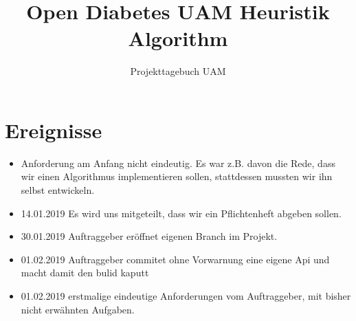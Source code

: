 \documentclass[accentcolor=tud0b,12pt,paper=a4]{tudreport}
\title{Open Diabetes UAM Heuristik Algorithm}
\subtitle{Projekttagebuch UAM}
\begin{document}
	\maketitle
		
	\newpage
	\chapter*{Ereignisse}
	
	
	\begin{itemize}
	
	\item Anforderung am Anfang nicht eindeutig. Es war z.B. davon die Rede, dass wir einen Algorithmus implementieren sollen, stattdessen mussten wir ihn selbst entwickeln.
	\item 14.01.2019 Es wird uns mitgeteilt, dass wir ein Pflichtenheft abgeben sollen.
	\item 30.01.2019 Auftraggeber eröffnet eigenen Branch im Projekt.
	\item 01.02.2019 Auftraggeber commitet ohne Vorwarnung eine eigene Api und macht damit den bulid kaputt 
	\item 01.02.2019 erstmalige eindeutige Anforderungen vom Auftraggeber, mit bisher nicht erwähnten Aufgaben.
	
	
	
	
	\end{itemize}		

	
	
	
\end{document}
